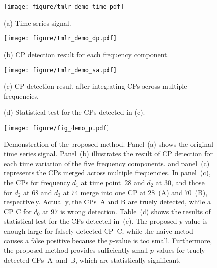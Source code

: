 \begin{figure}[H]
  \centering
  \begin{minipage}[t]{0.3\hsize}
      \centering
      \texttt{[image: figure/tmlr\_demo\_time.pdf]}
      \caption*{(a) Time series signal.}
  \end{minipage}  
  \hspace{5mm} 
  \begin{minipage}[t]{0.3\hsize}
      \centering
      \texttt{[image: figure/tmlr\_demo\_dp.pdf]}
      \caption*{(b) CP detection result for each frequency component.}
  \end{minipage}
  \hspace{5mm} 
  \begin{minipage}[t]{0.3\hsize}
      \centering
      \texttt{[image: figure/tmlr\_demo\_sa.pdf]}
      \caption*{(c) CP detection result after integrating CPs across multiple frequencies.}
  \end{minipage}
  
  \vspace{3mm}

  \begin{minipage}[t]{0.6\hsize}
    \centering
    \caption*{(d) Statistical test for the CPs detected in (c).}
    \texttt{[image: figure/fig\_demo\_p.pdf]}
  \end{minipage}

  \caption{ Demonstration of the proposed method. 
            Panel~(a) shows the original time series signal. 
            Panel~(b) illustrates the result of CP detection for each time variation of the five frequency components, 
            and panel~(c) represents the CPs merged across multiple frequencies.
            In panel~(c), the CPs for frequency $d_1$ at time point~$28$ and $d_2$ at $30$, 
            and those for $d_2$ at $68$ and $d_3$ at $74$ merge into one CP at $28$~(A) and $70$~(B), respectively.
            Actually, the CPs~A and B are truely detected, while a CP C for $d_0$ at $97$ is wrong detection. 
            Table~(d) shows the results of statistical test for the CPs detected in~(c). 
            The proposed $p$-value is enough large for falsely detected CP~C, 
            while the naive metod causes a false positive because the $p$-value is too small. 
            Furthermore, the proposed method provides sufficiently small $p$-values for truely detected CPs~A~and~B, 
            which are statistically significant.
          }
  \label{fig_demo}
\end{figure}
%

